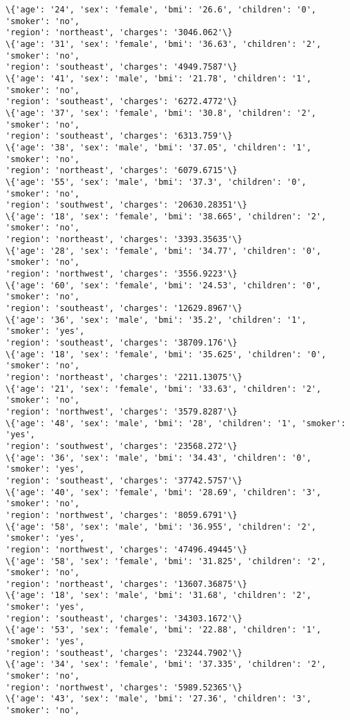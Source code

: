 \documentclass[11pt]{article}
\begin{document}
\begin{Verbatim}[commandchars=\\\{\}]
\{'age': '24', 'sex': 'female', 'bmi': '26.6', 'children': '0', 'smoker': 'no',
'region': 'northeast', 'charges': '3046.062'\}
\{'age': '31', 'sex': 'female', 'bmi': '36.63', 'children': '2', 'smoker': 'no',
'region': 'southeast', 'charges': '4949.7587'\}
\{'age': '41', 'sex': 'male', 'bmi': '21.78', 'children': '1', 'smoker': 'no',
'region': 'southeast', 'charges': '6272.4772'\}
\{'age': '37', 'sex': 'female', 'bmi': '30.8', 'children': '2', 'smoker': 'no',
'region': 'southeast', 'charges': '6313.759'\}
\{'age': '38', 'sex': 'male', 'bmi': '37.05', 'children': '1', 'smoker': 'no',
'region': 'northeast', 'charges': '6079.6715'\}
\{'age': '55', 'sex': 'male', 'bmi': '37.3', 'children': '0', 'smoker': 'no',
'region': 'southwest', 'charges': '20630.28351'\}
\{'age': '18', 'sex': 'female', 'bmi': '38.665', 'children': '2', 'smoker': 'no',
'region': 'northeast', 'charges': '3393.35635'\}
\{'age': '28', 'sex': 'female', 'bmi': '34.77', 'children': '0', 'smoker': 'no',
'region': 'northwest', 'charges': '3556.9223'\}
\{'age': '60', 'sex': 'female', 'bmi': '24.53', 'children': '0', 'smoker': 'no',
'region': 'southeast', 'charges': '12629.8967'\}
\{'age': '36', 'sex': 'male', 'bmi': '35.2', 'children': '1', 'smoker': 'yes',
'region': 'southeast', 'charges': '38709.176'\}
\{'age': '18', 'sex': 'female', 'bmi': '35.625', 'children': '0', 'smoker': 'no',
'region': 'northeast', 'charges': '2211.13075'\}
\{'age': '21', 'sex': 'female', 'bmi': '33.63', 'children': '2', 'smoker': 'no',
'region': 'northwest', 'charges': '3579.8287'\}
\{'age': '48', 'sex': 'male', 'bmi': '28', 'children': '1', 'smoker': 'yes',
'region': 'southwest', 'charges': '23568.272'\}
\{'age': '36', 'sex': 'male', 'bmi': '34.43', 'children': '0', 'smoker': 'yes',
'region': 'southeast', 'charges': '37742.5757'\}
\{'age': '40', 'sex': 'female', 'bmi': '28.69', 'children': '3', 'smoker': 'no',
'region': 'northwest', 'charges': '8059.6791'\}
\{'age': '58', 'sex': 'male', 'bmi': '36.955', 'children': '2', 'smoker': 'yes',
'region': 'northwest', 'charges': '47496.49445'\}
\{'age': '58', 'sex': 'female', 'bmi': '31.825', 'children': '2', 'smoker': 'no',
'region': 'northeast', 'charges': '13607.36875'\}
\{'age': '18', 'sex': 'male', 'bmi': '31.68', 'children': '2', 'smoker': 'yes',
'region': 'southeast', 'charges': '34303.1672'\}
\{'age': '53', 'sex': 'female', 'bmi': '22.88', 'children': '1', 'smoker': 'yes',
'region': 'southeast', 'charges': '23244.7902'\}
\{'age': '34', 'sex': 'female', 'bmi': '37.335', 'children': '2', 'smoker': 'no',
'region': 'northwest', 'charges': '5989.52365'\}
\{'age': '43', 'sex': 'male', 'bmi': '27.36', 'children': '3', 'smoker': 'no',

\end{Verbatim}
\end{document}
